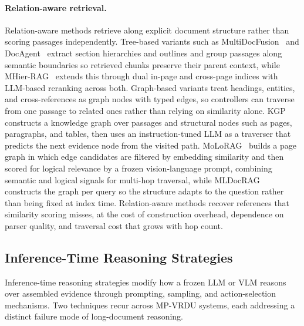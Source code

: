 \documentclass[11pt]{article}
\begin{document}
\paragraph{Relation-aware retrieval.} Relation-aware methods retrieve along explicit document structure rather than scoring passages independently. Tree-based variants such as MultiDocFusion~\cite{shin2025multidocfusion} and DocAgent~\cite{sun2025docagent} extract section hierarchies and outlines and group passages along semantic boundaries so retrieved chunks preserve their parent context, while MHier-RAG~\cite{gong2025mhierrag} extends this through dual in-page and cross-page indices with LLM-based reranking across both. Graph-based variants treat headings, entities, and cross-references as graph nodes with typed edges, so controllers can traverse from one passage to related ones rather than relying on similarity alone. KGP~\cite{wang2024knowledge} constructs a knowledge graph over passages and structural nodes such as pages, paragraphs, and tables, then uses an instruction-tuned LLM as a traverser that predicts the next evidence node from the visited path. MoLoRAG~\cite{wu2025molorag} builds a page graph in which edge candidates are filtered by embedding similarity and then scored for logical relevance by a frozen vision-language prompt, combining semantic and logical signals for multi-hop traversal, while MLDocRAG~\cite{zhang2026mldocrag} constructs the graph per query so the structure adapts to the question rather than being fixed at index time. Relation-aware methods recover references that similarity scoring misses, at the cost of construction overhead, dependence on parser quality, and traversal cost that grows with hop count.

\subsection{Inference-Time Reasoning Strategies}
\label{sec:tf-reasoning}

Inference-time reasoning strategies modify how a frozen LLM or VLM reasons over assembled evidence through prompting, sampling, and action-selection mechanisms. Two techniques recur across MP-VRDU systems, each addressing a distinct failure mode of long-document reasoning.
\end{document}
